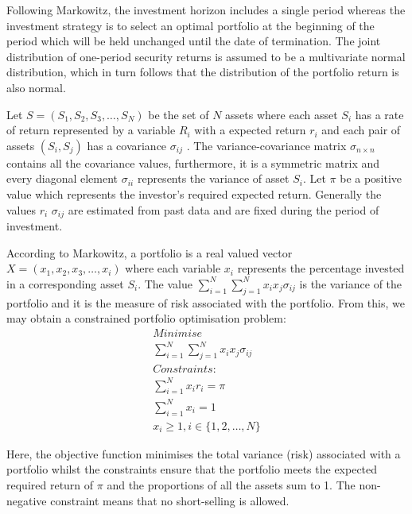 \documentclass{pdfmx4020}
\begin{document}
    Following Markowitz, the investment horizon includes a single period whereas the investment strategy is to select an optimal portfolio at the beginning of the period which will be held unchanged until the date of termination. The joint distribution of one-period security returns is assumed to be a multivariate normal distribution, which in turn follows that the distribution of the portfolio return is also normal. 

    Let $S = (S_1,S_2,S_3, \dots , S_N)$ be the set of $N$ assets where each asset $S_i$ has a rate of return represented by a variable $R_i$ with a expected return $r_i$ and each pair of assets $(S_i,S_j)$ has a covariance $\sigma_{ij}$ . The variance-covariance matrix $\sigma_{n\times n}$ contains all the covariance values, furthermore, it is a symmetric matrix and every diagonal element $\sigma_{ii}$ represents the variance of asset $S_i$. Let $\pi$ be a positive value which represents the investor's required expected return. Generally the values $r_i$ $\sigma_{ij}$ are estimated from past data and are fixed during the period of investment. 

    According to Markowitz, a portfolio is a real valued vector $X = (x_1,x_2,x_3, \dots ,x_i)$ where each variable $x_i$ represents the percentage invested in a corresponding asset $S_i$. The value $\sum\limits_{i=1}^N \sum\limits_{j=1}^N x_i x_j \sigma_{ij}$ is the variance of the portfolio and it is the measure of risk associated with the portfolio. From this, we may obtain a constrained portfolio optimisation problem: 
    \begin{equation}
      \begin{split}
        Minimise \\
        \sum\limits_{i=1}^N \sum\limits_{j=1}^N x_i x_j \sigma_{ij} \\
        Constraints:\\
        \sum\limits_{i=1}^N x_i r_i = \pi \\
        \sum\limits_{i=1}^N x_i = 1 \\
        x_i \geq 1, i \in \{1,2,\dots,N\}
      \end{split}
    \end{equation}

    Here, the objective function minimises the total variance (risk) associated with a portfolio whilst the constraints ensure that the portfolio meets the expected required return of $\pi$ and the proportions of all the assets sum to 1. The non-negative constraint means that no short-selling is allowed. 
\end{document}
